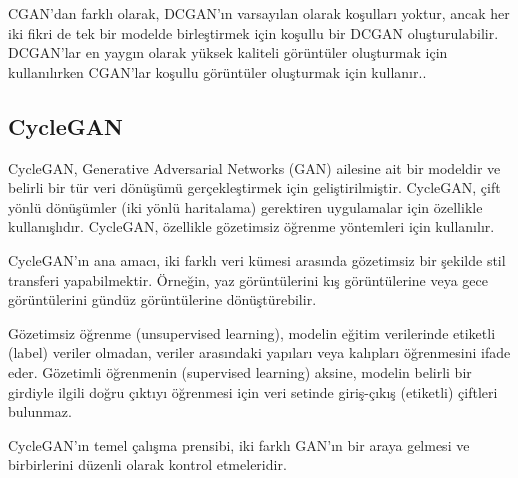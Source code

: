 \documentclass[12pt, a4paper]{article}
\begin{document}
	CGAN'dan farklı olarak, DCGAN'ın varsayılan olarak koşulları yoktur, ancak her iki fikri de tek bir modelde birleştirmek için koşullu bir DCGAN oluşturulabilir. DCGAN'lar en yaygın olarak yüksek kaliteli görüntüler oluşturmak için kullanılırken CGAN'lar koşullu görüntüler oluşturmak için kullanır.\cite{What-2024-05-08}.
	
	\subsection{CycleGAN}
	
	CycleGAN, Generative Adversarial Networks (GAN) ailesine ait bir modeldir ve belirli bir tür veri dönüşümü gerçekleştirmek için geliştirilmiştir. CycleGAN, çift yönlü dönüşümler (iki yönlü haritalama) gerektiren uygulamalar için özellikle kullanışlıdır. CycleGAN, özellikle gözetimsiz öğrenme yöntemleri için kullanılır.
	
	CycleGAN'ın ana amacı, iki farklı veri kümesi arasında gözetimsiz bir şekilde stil transferi yapabilmektir. Örneğin, yaz görüntülerini kış görüntülerine veya gece görüntülerini gündüz görüntülerine dönüştürebilir. 
	
	Gözetimsiz öğrenme (unsupervised learning), modelin eğitim verilerinde etiketli (label) veriler olmadan, veriler arasındaki yapıları veya kalıpları öğrenmesini ifade eder. Gözetimli öğrenmenin (supervised learning) aksine, modelin belirli bir girdiyle ilgili doğru çıktıyı öğrenmesi için veri setinde giriş-çıkış (etiketli) çiftleri bulunmaz\cite{What-2024-05-22}.
	
	CycleGAN'ın temel çalışma prensibi, iki farklı GAN'ın bir araya gelmesi ve birbirlerini düzenli olarak kontrol etmeleridir.
	
\end{document}
